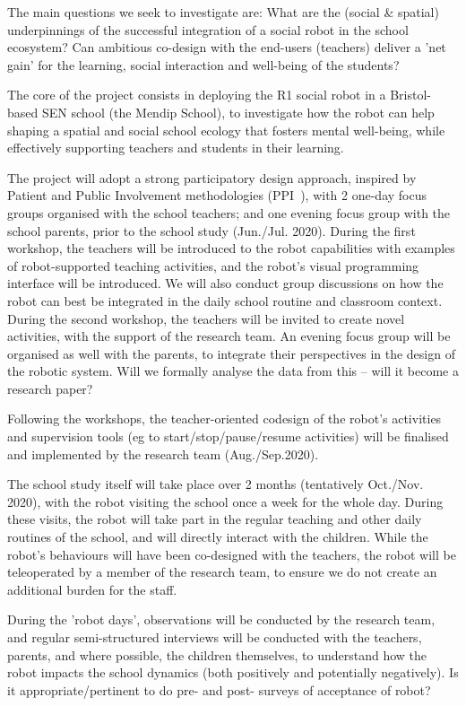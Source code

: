 \documentclass[11pt,a4paper]{report}
\begin{document}
The main questions we seek to investigate are: What are the (social \& spatial)
underpinnings of the successful integration of a social robot in the school
ecosystem? Can ambitious co-design with the end-users (teachers) deliver a 'net
gain' for the learning, social interaction and well-being of the students? 


The core of the project consists in deploying the R1 social robot in a
Bristol-based SEN school (the Mendip School), to investigate how the robot can
help shaping a spatial and social school ecology that fosters mental well-being,
while effectively supporting teachers and students in their learning. 

The project will adopt a strong participatory design approach, inspired by
Patient and Public Involvement methodologies (PPI~\cite{boivin2010patient}), with 2 one-day
focus groups organised with the school teachers; and one evening focus group with the
school parents, prior to the school study (Jun./Jul. 2020). During the first
workshop, the teachers will be introduced to the robot capabilities with
examples of robot-supported teaching activities, and the robot's visual
programming interface will be introduced. We will also conduct group discussions
on how the robot can best be integrated in the daily school routine and
classroom context. During the second workshop, the teachers will be invited to
create novel activities, with the support of the research team. An evening focus
group will be organised as well with the parents, to integrate their
perspectives in the design of the robotic system.  Will we formally analyse the
data from this – will it become a research paper? 

Following the workshops, the teacher-oriented codesign of the robot's activities
and supervision tools (eg to start/stop/pause/resume activities) will be
finalised and implemented by the research team (Aug./Sep.2020). 

The school study itself will take place over 2 months (tentatively Oct./Nov.
2020), with the robot visiting the school once a week for the whole day. During
these visits, the robot will take part in the regular teaching and other daily
routines of the school, and will directly interact with the children. While the
robot's behaviours will have been co-designed with the teachers, the robot will
be teleoperated by a member of the research team, to ensure we do not create an
additional burden for the staff. 

During the 'robot days', observations will be conducted by the research team,
and regular semi-structured interviews will be conducted with the teachers,
parents, and where possible, the children themselves, to understand how the
robot impacts the school dynamics  (both positively and potentially negatively).
Is it appropriate/pertinent to do pre- and post- surveys of acceptance of robot? 
\end{document}
